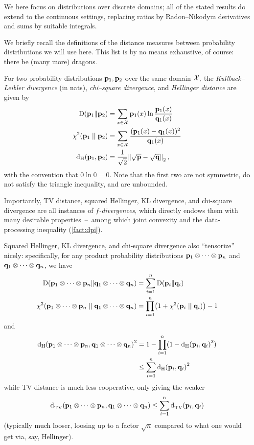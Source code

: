We here focus on distributions over discrete domains; all of the stated results do extend to the continuous settings, replacing ratios by Radon--Nikodym derivatives and sums by suitable integrals.

We briefly recall the definitions of the distance measures between probability distributions we will use here. This list is by no means exhaustive, of course: there be (many more) dragons. 
\begin{definition}
For two probability distributions $\mathbf{p}_1,\mathbf{p}_2$ over the same domain $\mathcal{X}$, the \emph{Kullback--Leibler divergence} (in nats), \emph{chi--square divergence}, and \emph{Hellinger distance} are given by
\begin{align}
	\kldiv{\p_1}{\p_2} &= \sum_{x\in\domain} \p_1(x) \ln \frac{\p_1(x)}{\q_1(x)} \\
	\chisquare{\p_1}{\p_2} &= \sum_{x\in\domain} \frac{(\p_1(x)-\q_1(x))^2}{\q_1(x)} \\
	\hellinger{\p_1}{\p_2} %
	&= \frac{1}{\sqrt{2}}\normtwo{\sqrt{\p}-\sqrt{\q}}\,,
\end{align}
with the convention that $0\ln 0 = 0$. Note that the first two are not symmetric, do not satisfy the triangle inequality, and are unbounded.
\end{definition}

Importantly, TV distance, squared Hellinger, KL divergence, and chi-square divergence are all instances of \emph{$f$-divergences}, which directly endows them with many desirable properties~--~among which joint convexity and the data-processing inequality (\cref{fact:dpi}).

Squared Hellinger, KL divergence, and chi-square divergence also ``tensorize'' nicely: specifically, for any product probability distributions $\mathbf{p}_1\otimes\cdots\otimes\mathbf{p}_n$ and $\mathbf{q}_1\otimes\cdots\otimes\mathbf{q}_n$, we have
\begin{align}
\kldiv{\p_1\otimes\cdots\otimes\p_n}{\q_1\otimes\cdots\otimes\q_n} 
&= \sum_{i=1}^n \kldiv{\p_i}{\q_i} \\
\chisquare{\p_1\otimes\cdots\otimes\p_n}{\q_1\otimes\cdots\otimes\q_n} 
&= \prod_{i=1}^n \Paren{1+\chisquare{\p_i}{\q_i}} - 1
\end{align}
and
\begin{align}
\hellinger{\p_1\otimes\cdots\otimes\p_n}{\q_1\otimes\cdots\otimes\q_n}^2 
&= 1 - \prod_{i=1}^n (1-\hellinger{\p_i}{\q_i}^2) \notag\\
&\leq \sum_{i=1}^n \hellinger{\p_i}{\q_i}^2
\end{align}
while TV distance is much less cooperative, only giving the weaker
\begin{equation}
\totalvardist{\p_1\otimes\cdots\otimes\p_n}{\q_1\otimes\cdots\otimes\q_n} \leq \sum_{i=1}^n \totalvardist{\p_i}{\q_i}
\end{equation}
(typically much looser, loosing up to a factor $\sqrt{n}$ compared to what one would get via, say, Hellinger).


